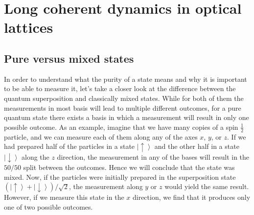 \chapter{Long coherent dynamics in optical lattices}

\section{Pure versus mixed states}
In order to understand what the purity of a state means and why it is important to be able to measure it, let's take a closer look at the difference between the quantum superposition and classically mixed states. While for both of them the measurements in most basis will lead to multiple different outcomes, for a pure quantum state there exists a basis in which a measurement will result in only one possible outcome. As an example, imagine that we have many copies of a spin $\frac{1}{2}$ particle, and we can measure each of them along any of the axes $x$, $y$, or $z$. If we had prepared half of the particles in a state $\left| \uparrow \right>$ and the other half in a state $\left| \downarrow \right>$ along the $z$ direction, the measurement in any of the bases will result in the $50/50$ split between the outcomes. Hence we will conclude that the state was mixed. Now, if the particles were initially prepared in the superposition state $(\left| \uparrow  \right>+ \left| \downarrow \right>)/\sqrt{2}$, the measurement along $y$ or $z$ would yield the same result. However, if we measure this state in the $x$ direction, we find that it produces only one of two possible outcomes. 

